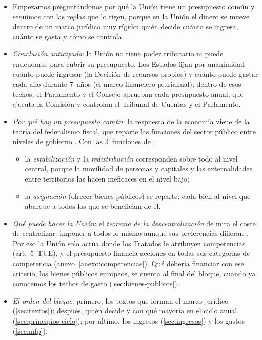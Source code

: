 \documentclass[11pt]{article}
\begin{document}
\begin{itemize}
\item Empezamos preguntándonos por qué la Unión tiene un presupuesto común y seguimos con las reglas que lo rigen, porque en la Unión el dinero se mueve dentro de un marco jurídico muy rígido: quién decide cuánto se ingresa, cuánto se gasta y cómo se controla.
\item \emph{Conclusión anticipada}: la Unión no tiene poder tributario ni puede endeudarse para cubrir su presupuesto. Los Estados fijan por unanimidad cuánto puede ingresar (la Decisión de recursos propios) y cuánto puede gastar cada año durante 7~años (el marco financiero plurianual); dentro de esos techos, el Parlamento y el Consejo aprueban cada presupuesto anual, que ejecuta la Comisión y controlan el Tribunal de Cuentas y el Parlamento.
\item \emph{Por qué hay un presupuesto común}: la respuesta de la economía viene de la teoría del federalismo fiscal, que reparte las funciones del sector público entre niveles de gobierno . Con las 3~funciones de \textcite{Musgrave1959Theory}:
  \begin{itemize}
  \item la \emph{estabilización} y la \emph{redistribución} corresponden sobre todo al nivel central, porque la movilidad de personas y capitales y las externalidades entre territorios las hacen ineficaces en el nivel bajo;
  \item la \emph{asignación} (ofrecer bienes públicos) se reparte: cada bien al nivel que abarque a todos los que se benefician de él.
  \end{itemize}
\item \emph{Qué puede hacer la Unión}: el \emph{teorema de la descentralización} de \textcite{Oates1972Fiscal} mira el coste de centralizar: imponer a todos lo mismo aunque sus preferencias difieran . Por eso la Unión solo actúa donde los Tratados le atribuyen competencias (art.~5~TUE), y el presupuesto financia acciones en todas sus categorías de competencia (anexo~\ref{anexo:competencias}). Qué debería financiar con ese criterio, los bienes públicos europeos, se cuenta al final del bloque, cuando ya conocemos los techos de gasto (\ref{sec:bienes-publicos}).
\item \emph{El orden del bloque}: primero, los textos que forman el marco jurídico (\ref{sec:textos}); después, quién decide y con qué mayoría en el ciclo anual (\ref{sec:principios-ciclo}); por último, los ingresos (\ref{sec:ingresos}) y los gastos (\ref{sec:mfp}).
\end{itemize}
\end{document}
